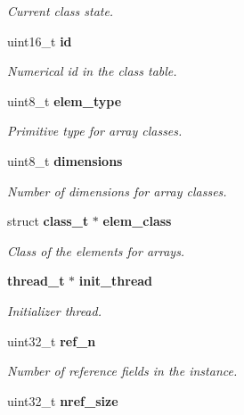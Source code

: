 \begin{DoxyCompactItemize}
\begin{DoxyCompactList}\small\item\em Current class state. \item\end{DoxyCompactList}\item 
uint16\_\-t {\bf id}\label{structclass__t_a068d530ff6aae94cd9a9d2516639585d}

\begin{DoxyCompactList}\small\item\em Numerical id in the class table. \item\end{DoxyCompactList}\item 
uint8\_\-t {\bf elem\_\-type}\label{structclass__t_a7dfd81dda898b45dd3d0e0f62f853e4c}

\begin{DoxyCompactList}\small\item\em Primitive type for array classes. \item\end{DoxyCompactList}\item 
uint8\_\-t {\bf dimensions}\label{structclass__t_a9a43faf1ecc0366bd9004ddc75e1a3f6}

\begin{DoxyCompactList}\small\item\em Number of dimensions for array classes. \item\end{DoxyCompactList}\item 
struct {\bf class\_\-t} $\ast$ {\bf elem\_\-class}\label{structclass__t_a2e5d89224b905d5d82bae7a463549da8}

\begin{DoxyCompactList}\small\item\em Class of the elements for arrays. \item\end{DoxyCompactList}\item 
{\bf thread\_\-t} $\ast$ {\bf init\_\-thread}\label{structclass__t_ae4407e5f3ad1eb9999b91f6f359713e9}

\begin{DoxyCompactList}\small\item\em Initializer thread. \item\end{DoxyCompactList}\item 
uint32\_\-t {\bf ref\_\-n}\label{structclass__t_a6f501c3998098ecfd245c3a5bca1f06b}

\begin{DoxyCompactList}\small\item\em Number of reference fields in the instance. \item\end{DoxyCompactList}\item 
uint32\_\-t {\bf nref\_\-size}\label{structclass__t_aabf04988cd4a8255a836d4bb780c88a5}


\end{DoxyCompactItemize}
